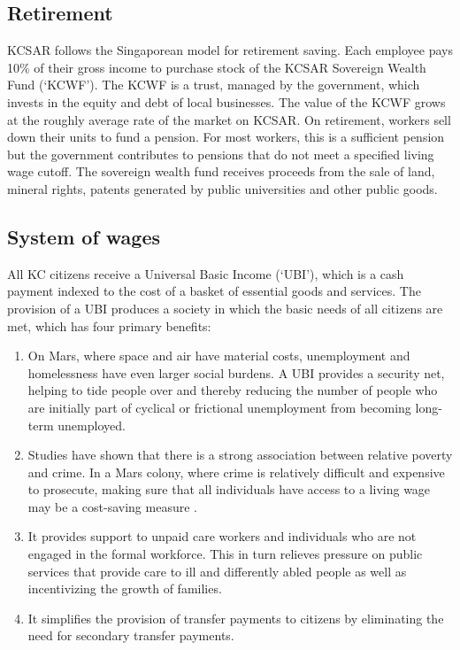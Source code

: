 \documentclass[fleqn,10pt]{Stylesheet} %
\begin{document}
\subsection{Retirement}
KCSAR follows the Singaporean model for retirement saving. Each employee pays 10\% of their gross income to purchase stock of the KCSAR Sovereign Wealth Fund (‘KCWF’). The KCWF is a trust, managed by the government, which invests in the equity and debt of local businesses. The value of the KCWF grows at the roughly average rate of the market on KCSAR. On retirement, workers sell down their units to fund a pension. For most workers, this is a sufficient pension but the government contributes to pensions that do not meet a specified living wage cutoff. The sovereign wealth fund receives proceeds from the sale of land, mineral rights, patents generated by public universities and other public goods.

\subsection{System of wages}
All KC citizens receive a Universal Basic Income (‘UBI’), which is a cash payment indexed to the cost of a basket of essential goods and services. The provision of a UBI produces a society in which the basic needs of all citizens are met, which has four primary benefits: 

\begin{enumerate}
    \item On Mars, where space and air have material costs, unemployment and homelessness have even larger social burdens. A UBI provides a security net, helping to tide people over and thereby reducing the number of people who are initially part of cyclical or frictional unemployment from becoming long-term unemployed.
    \item Studies have shown that there is a strong association between relative poverty and crime. In a Mars colony, where crime is relatively difficult and expensive to prosecute, making sure that all individuals have access to a living wage may be a cost-saving measure \cite{Hooghe}.
    \item It provides support to unpaid care workers and individuals who are not engaged in the formal workforce. This in turn relieves pressure on public services that provide care to ill and differently abled people as well as incentivizing the growth of families.  
    \item It simplifies the provision of transfer payments to citizens by eliminating the need for secondary transfer payments. 
\end{enumerate}
\end{document}
